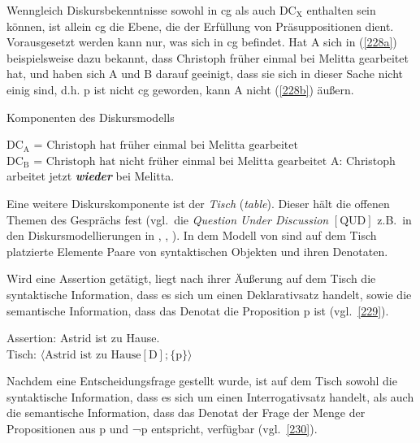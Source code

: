 Wenngleich Diskursbekenntnisse sowohl in cg als auch $\textrm{DC}_{\textrm{X}}$ enthalten sein können, ist allein cg die Ebene, die der Erfüllung von Präsuppositionen  dient. Vorausgesetzt werden kann nur, was sich in cg befindet. Hat A sich in (\ref{228a}) beispielsweise dazu bekannt, dass Christoph früher einmal bei Melitta gearbeitet hat, und haben sich A und B darauf geeinigt, dass sie sich in dieser Sache nicht einig sind, d.h. p ist nicht cg geworden, kann A nicht (\ref{228b}) äußern.

\begin{exe}
	\ex\label{228} 
		Komponenten des Diskursmodells
		\begin{xlist}	
			\ex\label{228a} $\textrm{DC}_{\textrm{A}}$ = ${\textrm{Christoph hat früher einmal bei Melitta gearbeitet}}$\\
                        $\textrm{DC}_{\textrm{B}}$ = ${\textrm{Christoph hat nicht früher einmal bei Melitta gearbeitet}}$	
			\ex\label{228b} A: Christoph arbeitet jetzt \textbf{\textit{wieder}} bei Melitta.  
		\end{xlist}
\end{exe}

\noindent
Eine weitere Diskurskomponente ist der \textit{Tisch} (\textit{table}). Dieser hält die offenen Themen des Gesprächs fest (vgl.\ die \textit{Question Under Discussion} $[\textrm{QUD}]$ z.B.\ in den Diskursmodellierungen in \citealt{Ginzburg1996}, \citealt{Roberts1996}, \citealt{Buering2003}). In dem Modell von \citet{Farkas2010} sind auf dem Tisch platzierte Elemente Paare von syntaktischen Objekten und ihren Denotaten. 

Wird eine Assertion  getätigt, liegt nach ihrer Äußerung auf dem Tisch die syntaktische Information, dass es sich um einen Deklarativsatz handelt, sowie die semantische Information, dass das Denotat die Proposition p ist (vgl.\ \ref{229}).

\begin{exe}
	\ex\label{229} 
			Assertion: Astrid ist zu Hause.\\
			Tisch: $\langle \textrm{Astrid ist zu Hause}[\textrm{D}]; \lbrace \textrm{p}\rbrace \rangle$
\end{exe}
Nachdem eine Entscheidungsfrage  gestellt wurde, ist auf dem Tisch sowohl die syntaktische Information, dass es sich um einen Interrogativsatz handelt, als auch die semantische Information, dass das Denotat der Frage der Menge der Propositionen aus p und ¬p entspricht, verfügbar (vgl.\ \ref{230}).

